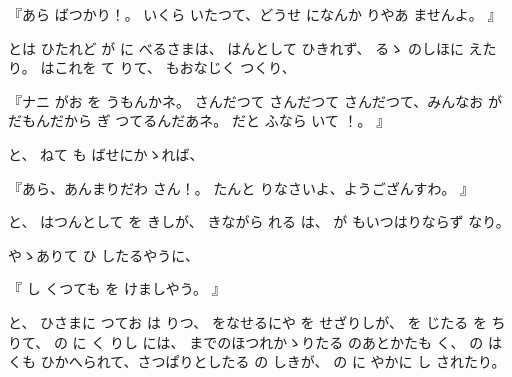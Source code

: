
『あら
ばつかり！。
いくら
いたつて、どうせ
になんか
りやあ
ませんよ。
』

とは
ひたれど
が
に
べるさまは、
はんとして
ひきれず、
るゝ
のしほに
えたり。
はこれを
て
りて、
もおなじく
つくり、

『ナニ
がお
を
うもんかネ。
さんだつて
さんだつて
さんだつて、みんなお
が
だもんだから
ぎ
つてるんだあネ。
だと
ふなら
いて
！。
』

と、
ねて
も
ばせにかゝれば、

『あら、あんまりだわ
さん！。
たんと
りなさいよ、ようござんすわ。
』

と、
はつんとして
を
きしが、
きながら
れる
は、
が
もいつはりならず
なり。

やゝありて
ひ
したるやうに、

『
し
くつても
を
けましやう。
』

と、
ひさまに
つてお
は
りつ、
をなせるにや
を
せざりしが、
を
じたる
を
ち
りて、
の
に
く
りし
には、
までのほつれかゝりたる
のあとかたも
く、
の
は
くも
ひかへられて、さつぱりとしたる
の
しきが、
の
に
やかに
し
されたり。

